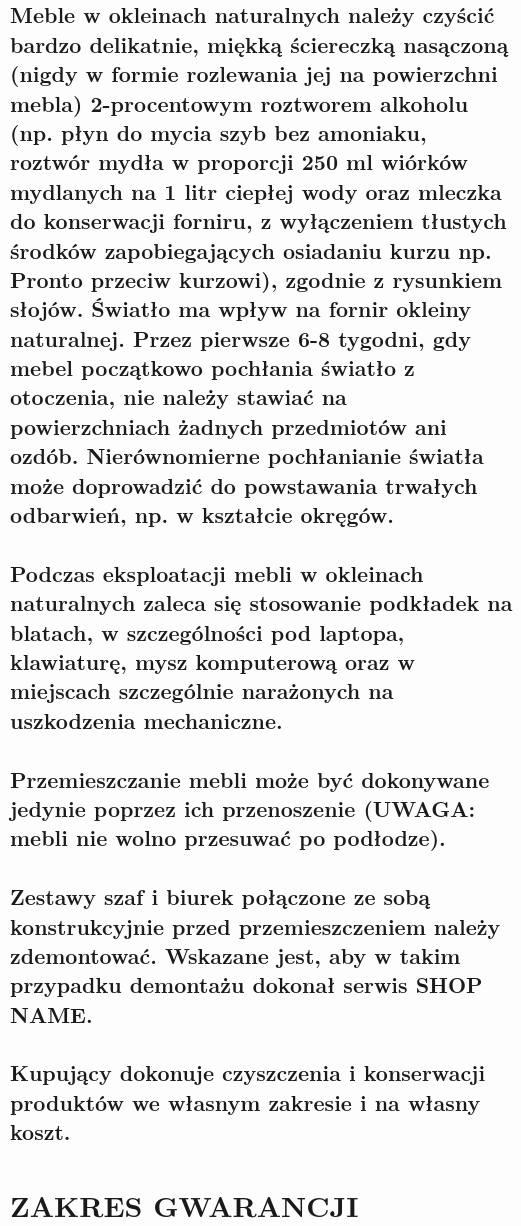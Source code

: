 \documentclass[10pt,a4paper]{article}
\newcommand{\shopname}{SHOP NAME}
\begin{document}
\subsection{Meble w okleinach naturalnych należy czyścić bardzo delikatnie, miękką ściereczką nasączoną (nigdy w formie rozlewania jej na
powierzchni mebla) 2-procentowym roztworem alkoholu (np. płyn do mycia szyb bez amoniaku, roztwór mydła w proporcji 250 ml
wiórków mydlanych na 1 litr ciepłej wody oraz mleczka do konserwacji forniru, z wyłączeniem tłustych środków zapobiegających
osiadaniu kurzu np. Pronto przeciw kurzowi), zgodnie z rysunkiem słojów.
Światło ma wpływ na fornir okleiny naturalnej. Przez pierwsze 6-8 tygodni, gdy mebel początkowo pochłania światło z otoczenia, nie
należy stawiać na powierzchniach żadnych przedmiotów ani ozdób. Nierównomierne pochłanianie światła może doprowadzić do
powstawania trwałych odbarwień, np. w kształcie okręgów.}

\subsection{Podczas eksploatacji mebli w okleinach naturalnych zaleca się stosowanie podkładek na blatach, w szczególności pod laptopa,
klawiaturę, mysz komputerową oraz w miejscach szczególnie narażonych na uszkodzenia mechaniczne.}

\subsection{Przemieszczanie mebli może być dokonywane jedynie poprzez ich przenoszenie (UWAGA: mebli nie wolno przesuwać po podłodze).}

\subsection{Zestawy szaf i biurek połączone ze sobą konstrukcyjnie przed przemieszczeniem należy zdemontować. Wskazane jest, aby w takim
przypadku demontażu dokonał serwis \shopname.}

\subsection{Kupujący dokonuje czyszczenia i konserwacji produktów we własnym zakresie i na własny koszt.}

\section{ZAKRES GWARANCJI}
\end{document}

